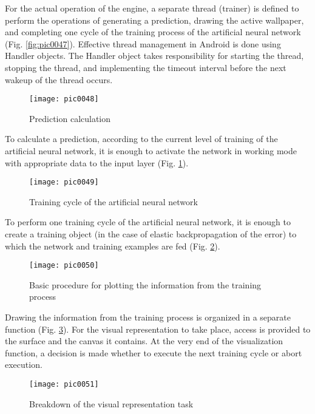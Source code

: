 For the actual operation of the engine, a separate thread (trainer) is defined to perform the operations of generating a prediction, drawing the active wallpaper, and completing one cycle of the training process of the artificial neural network (Fig. \ref {fig:pic0047}). Effective thread management in Android is done using Handler objects. The Handler object takes responsibility for starting the thread, stopping the thread, and implementing the timeout interval before the next wakeup of the thread occurs.

\begin{figure}[h]
\centering
\texttt{[image: pic0048]}
\caption{Prediction calculation}
\label{fig:pic0048}
\end{figure}
\FloatBarrier

To calculate a prediction, according to the current level of training of the artificial neural network, it is enough to activate the network in working mode with appropriate data to the input layer (Fig. \ref{fig:pic0048}).

\begin{figure}[h]
\centering
\texttt{[image: pic0049]}
\caption{Training cycle of the artificial neural network}
\label{fig:pic0049}
\end{figure}
\FloatBarrier

To perform one training cycle of the artificial neural network, it is enough to create a training object (in the case of elastic backpropagation of the error) to which the network and training examples are fed (Fig. \ref{fig:pic0049}).

\begin{figure}[h]
\centering
\texttt{[image: pic0050]}
\caption{Basic procedure for plotting the information from the training process}
\label{fig:pic0050}
\end{figure}
\FloatBarrier

Drawing the information from the training process is organized in a separate function (Fig. \ref{fig:pic0050}). For the visual representation to take place, access is provided to the surface and the canvas it contains. At the very end of the visualization function, a decision is made whether to execute the next training cycle or abort execution.

\begin{figure}[h]
\centering
\texttt{[image: pic0051]}
\caption{Breakdown of the visual representation task}
\label{fig:pic0051}
\end{figure}
\FloatBarrier


